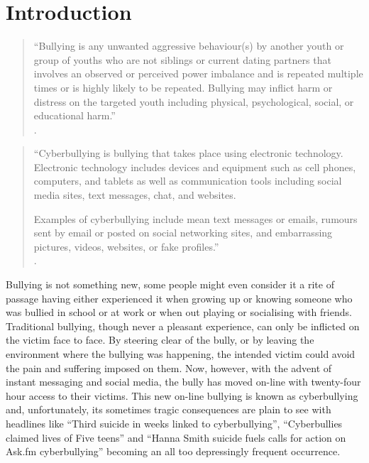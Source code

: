 
\chapter{Introduction} %

\label{chapter1} %


\begin{quotation}
``Bullying is any unwanted aggressive behaviour(s) by another youth or group of youths who are not siblings or current dating partners that involves an observed or perceived power imbalance and is repeated multiple times or is highly likely to be repeated. Bullying may inflict harm or distress on the targeted youth including physical, psychological, social, or educational harm.'' \\ 
\citet{assistant_secretary_for_public_affairs_what_2014}.
\end{quotation}

\begin{quotation}
``Cyberbullying is bullying that takes place using electronic technology. Electronic technology includes devices and equipment such as cell phones, computers, and tablets as well as communication tools including social media sites, text messages, chat, and websites.

Examples of cyberbullying include mean text messages or emails, rumours sent by email or posted on social networking sites, and embarrassing pictures, videos, websites, or fake profiles.'' \\ 
\citet{assistant_secretary_for_public_affairs_what_2012}.
\end{quotation}

Bullying is not something new, some people might even consider it a rite of passage having either experienced it when growing up or knowing someone who was bullied in school or at work or when out playing or socialising with friends. Traditional bullying, though never a pleasant experience, can only be inflicted on the victim face to face. By steering clear of the bully, or by leaving the environment where the bullying was happening, the intended victim could avoid the pain and suffering imposed on them. Now, however, with the advent of instant messaging and social media, the bully has moved on-line with twenty-four hour access to their victims. This new on-line bullying is known as cyberbullying and, unfortunately, its sometimes tragic consequences are plain to see with headlines like ``Third suicide in weeks linked to cyberbullying''\cite{Cionnaith:2102}, ``Cyberbullies claimed lives of Five teens''\cite{Riegel:2013} and ``Hanna Smith suicide fuels calls for action on Ask.fm cyberbullying''\cite{laura_smith-spark_hanna_2013} becoming an all too depressingly frequent occurrence.

